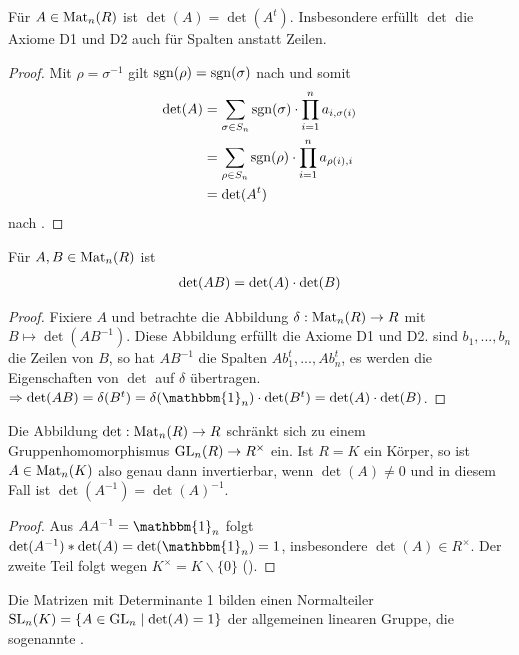 \begin{conclusion}
	Für $A\in \operatorname{Mat}_n(R)$ ist $\det(A)=\det(A^t)$. Insbesondere erfüllt $\det$ die Axiome D1 und D2 auch für Spalten 
	anstatt Zeilen.
\end{conclusion}
\begin{proof}
	Mit $\rho=\sigma^{-1}$ gilt $\operatorname{sgn}(\rho)=\operatorname{sgn}(\sigma)$ nach  und somit 
	\begin{align}
		\det(A)&=\sum_{\sigma\in S_n} \operatorname{sgn}(\sigma) \cdot \prod_
		{i=1}^n a_{i,\sigma(i)} \notag \\
		&=\sum_{\rho\in S_n} \operatorname{sgn}(\rho)\cdot \prod_{i=1}^n a_{\rho(i),i} \notag \\
		&=\det(A^t) \notag
	\end{align}
	nach .
\end{proof}

\begin{theorem}[Determinantenmultiplikationssatz]
	Für $A,B\in \operatorname{Mat}_n(R)$ ist 
	\begin{align}
		\det(AB)=\det(A)\cdot \det(B)\notag
	\end{align}
\end{theorem}
\begin{proof}
	Fixiere $A$ und betrachte die Abbildung $\delta: \operatorname{Mat}_n(R)\to R$ mit $B\mapsto \det(AB^{-1})$. Diese Abbildung erfüllt die Axiome 
	D1 und D2. sind $b_1,...,b_n$ die Zeilen von $B$, so hat $AB^{-1}$ die Spalten $Ab_1^t,...,Ab_n^t$, es werden die Eigenschaften 
	von $\det$ auf $\delta$ übertragen. \\
	$\Rightarrow \det(AB)=\delta(B^t)=\delta(\mathbbm{1}_n)\cdot \det(B^t)=\det(A)\cdot \det(B)$.
\end{proof}

\begin{conclusion}
	Die Abbildung $\det:\operatorname{Mat}_n(R)\to R$ schränkt sich zu einem Gruppenhomomorphismus $\operatorname{GL}_n(R)\to 
	R^{\times}$ ein. Ist $R=K$ ein Körper, so ist $A\in \operatorname{Mat}_n(K)$ also genau dann invertierbar, wenn $\det(A)\neq 0$ und in 
	diesem Fall ist $\det(A^{-1})=\det(A)^{-1}$.
\end{conclusion}
\begin{proof}
	Aus $AA^{-1}=\mathbbm{1}_n$ folgt $\det(A^{-1})*\det(A)=\det(\mathbbm{1}_n)=1$, insbesondere $\det(A)\in R^{\times}$. Der zweite Teil folgt wegen 
	$K^{\times}=K\backslash \{0\}$ ().
\end{proof}

\begin{conclusion}
	Die Matrizen mit Determinante 1 bilden einen Normalteiler $\operatorname{SL}_n(K)=\{A\in \operatorname{GL}_n \mid \det(A)=1\}$ der 
	allgemeinen linearen Gruppe, die sogenannte .
\end{conclusion}

